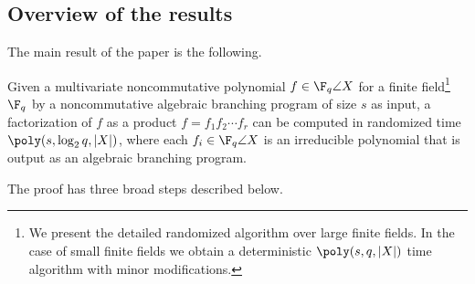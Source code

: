 %

\subsection{Overview of the results}

The main result of the paper is the following.

\begin{theorem*}
Given a multivariate noncommutative polynomial $f\in\F_q\angle{X}$ for
a finite field\footnote{We present the detailed randomized algorithm
  over large finite fields. In the case of small finite fields we
  obtain a deterministic $\poly(s,q,|X|)$ time algorithm with minor
  modifications.} $\F_q$ by a
noncommutative algebraic branching program of size $s$ as input, a
factorization of $f$ as a product $f=f_1f_2\cdots f_r$ can be computed
in randomized time $\poly(s,\log_2q,|X|)$, where each
$f_i\in\F_q\angle{X}$ is an irreducible polynomial that is output as
an algebraic branching program.
\end{theorem*} 
%


The proof has three broad steps described below.

